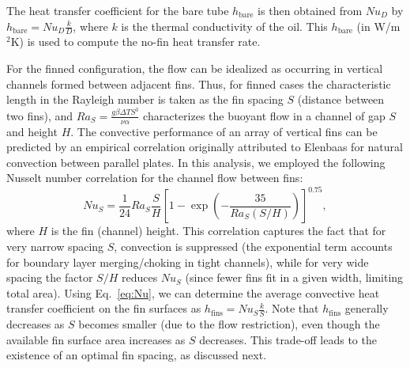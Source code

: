 \documentclass[12pt]{article}
\begin{document}
The heat transfer coefficient for the bare tube $h_{\text{bare}}$ is then obtained from $Nu_D$ by $h_{\text{bare}} = Nu_D \frac{k}{D}$, where $k$ is the thermal conductivity of the oil. This $h_{\text{bare}}$ (in W/m$^2$K) is used to compute the no-fin heat transfer rate.

For the finned configuration, the flow can be idealized as occurring in vertical channels formed between adjacent fins. Thus, for finned cases the characteristic length in the Rayleigh number is taken as the fin spacing $S$ (distance between two fins), and $Ra_S = \frac{g \beta \Delta T S^3}{\nu \alpha}$ characterizes the buoyant flow in a channel of gap $S$ and height $H$. The convective performance of an array of vertical fins can be predicted by an empirical correlation originally attributed to Elenbaas for natural convection between parallel plates. In this analysis, we employed the following Nusselt number correlation for the channel flow between fins:
\begin{equation}
Nu_S = \frac{1}{24} Ra_S \frac{S}{H} \left[1 - \exp\left(-\frac{35}{Ra_S (S/H)}\right)\right]^{0.75},
\label{eq:Nu}
\end{equation}
where $H$ is the fin (channel) height. This correlation captures the fact that for very narrow spacing $S$, convection is suppressed (the exponential term accounts for boundary layer merging/choking in tight channels), while for very wide spacing the factor $S/H$ reduces $Nu_S$ (since fewer fins fit in a given width, limiting total area). Using Eq.~\eqref{eq:Nu}, we can determine the average convective heat transfer coefficient on the fin surfaces as $h_{\text{fins}} = Nu_S \frac{k}{S}$. Note that $h_{\text{fins}}$ generally decreases as $S$ becomes smaller (due to the flow restriction), even though the available fin surface area increases as $S$ decreases. This trade-off leads to the existence of an optimal fin spacing, as discussed next.
\end{document}
